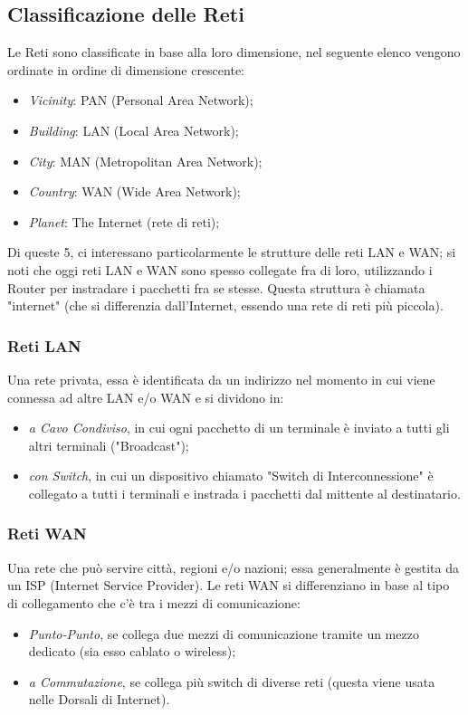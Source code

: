 \documentclass[a4paper]{article}
\begin{document}
	\newpage
	\subsection{Classificazione delle Reti}
		
		Le Reti sono classificate in base alla loro dimensione, nel seguente elenco vengono ordinate in ordine di dimensione crescente:
		\begin{itemize}
			\item \emph{Vicinity}: PAN (Personal Area Network);
			\item \emph{Building}: LAN (Local Area Network);
			\item \emph{City}: 	MAN (Metropolitan Area Network);
			\item \emph{Country}:	WAN (Wide Area Network);
			\item \emph{Planet}:	The Internet (rete di reti);
		\end{itemize}
		
		Di queste 5, ci interessano particolarmente le strutture delle reti LAN e WAN;
		si noti che oggi reti LAN e WAN sono spesso collegate fra di loro, utilizzando i Router per instradare i pacchetti fra se stesse. Questa struttura è chiamata "internet" (che si differenzia dall'Internet, essendo una rete di reti più piccola).
		
		\subsubsection{Reti LAN}
			
			Una rete privata, essa è identificata da un indirizzo nel momento in cui viene connessa ad altre LAN e/o WAN e si dividono in:
			\begin{itemize}
				\item \emph{a Cavo Condiviso}, in cui ogni pacchetto di un terminale è inviato a tutti gli altri terminali ("Broadcast");
				\item \emph{con Switch}, in cui un dispositivo chiamato "Switch di Interconnessione" è collegato a tutti i terminali e instrada i pacchetti dal mittente al destinatario.
			\end{itemize}
			
		\subsubsection{Reti WAN}
			
			Una rete che può servire città, regioni e/o nazioni; essa generalmente è gestita da un ISP (Internet Service Provider).
			Le reti WAN si differenziano in base al tipo di collegamento che c'è tra i mezzi di comunicazione:
			\begin{itemize}
				\item \emph{Punto-Punto}, se collega due mezzi di comunicazione tramite un mezzo dedicato (sia esso cablato o wireless);
				\item \emph{a Commutazione}, se collega più switch di diverse reti (questa viene usata nelle Dorsali di Internet).
			\end{itemize}
			
\end{document}
